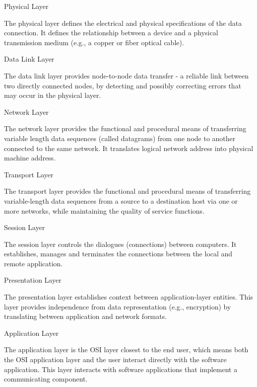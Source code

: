 \documentclass[a4paper,12pt]{report}
\begin{document}
\begin{etaremune}
\item Physical Layer

The physical layer defines the electrical and physical specifications of the data connection. It defines the relationship between a device and a physical transmission medium (e.g., a copper or fiber optical cable). 

\item Data Link Layer

The data link layer provides node-to-node data transfer - a reliable link between two directly connected nodes, by detecting and possibly correcting errors that may occur in the physical layer.

\item Network Layer

The network layer provides the functional and procedural means of transferring variable length data sequences (called datagrams) from one node to another connected to the same network. It translates logical network address into physical machine address. 

\item Transport Layer

The transport layer provides the functional and procedural means of transferring variable-length data sequences from a source to a destination host via one or more networks, while maintaining the quality of service functions.

\item Session Layer

The session layer controls the dialogues (connections) between computers. It establishes, manages and terminates the connections between the local and remote application. 

\item Presentation Layer

The presentation layer establishes context between application-layer entities. This layer provides independence from data representation (e.g., encryption) by translating between application and network formats.

\item Application Layer

The application layer is the OSI layer closest to the end user, which means both the OSI application layer and the user interact directly with the software application. This layer interacts with software applications that implement a communicating component.

\end{etaremune}
\end{document}
